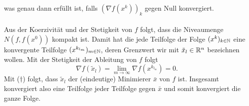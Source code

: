 was genau dann erfüllt ist, falls $(\nabla f(x^k))_k$ gegen Null konvergiert.
\\\\
Aus der Koerzivität und der Stetigkeit von $f$ folgt, dass die Niveaumenge $N(f,f(x^0))$ kompakt ist.
Damit hat die jede Teilfolge der Folge $(x^k)_{k\in\mathbb{N}}$ eine konvergente Teilfolge $(x^{k_{l_m}})_{m\in\mathbb{N}}$, deren Grenzwert wir mit $\tilde x_l\in\mathbb{R}^n$
bezeichnen wollen. Mit der Stetigkeit der Ableitung von $f$ folgt
\begin{displaymath}
 \nabla f(\tilde x_l)=\lim_{m\to\infty}\nabla f(x^{k_{l_m}})=0.
\end{displaymath}
Mit ($\dagger$) folgt, dass $\tilde x_l$ der (eindeutige) Minimierer $\bar x$ von $f$ ist. Insgesamt konvergiert also
eine Teilfolge jeder Teilfolge gegen $\bar x$ und somit konvergiert die ganze Folge.
